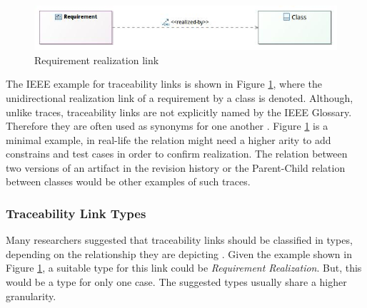 \documentclass[runningheads,a4paper]{llncs}
\begin{document}
\begin{figure}
\centering
\includegraphics[width=\textwidth]{SimpleRealizationTraceabilityLink.jpg}
\caption{Requirement realization link}
\label{fig:RequirementRealizationLink}
\end{figure}

The IEEE example for traceability links is shown in Figure \ref{fig:RequirementRealizationLink}, where the unidirectional realization link of a requirement by a class is denoted. 
Although, unlike traces, traceability links are not explicitly named by the IEEE Glossary.
Therefore they are often used as synonyms for one another \cite{TraceabilitySurvey}.
Figure \ref{fig:RequirementRealizationLink} is a minimal example, in real-life the relation might need a higher arity to add constrains and test cases in order to confirm realization.
The relation between two versions of an artifact in the revision history or the Parent-Child relation between classes would be other examples of such traces.


\subsubsection{Traceability Link Types}
\label{subsubsec:Traceability-Link-Types}
Many researchers suggested that traceability links should be classified in types, depending on the relationship they are depicting \cite{TraceabilitySurvey}.
Given the example shown in Figure \ref{fig:RequirementRealizationLink}, a suitable type for this link could be \textit{Requirement Realization}.
But, this would be a type for only one case.
The suggested types usually share a higher granularity.
\end{document}
